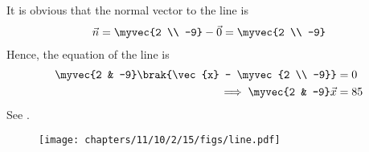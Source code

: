 It is obvious that the normal vector to the line is 
\begin{align}
\vec{n} =\myvec{2 \\ -9} -\vec{0} 
=\myvec{2 \\ -9}
\end{align}
Hence, the equation of the line is 
\begin{align}
	\myvec{2 & -9}\brak{\vec{x} - \myvec{2 \\ -9}}&= 0
	\\
	\implies 
	\myvec{2 & -9}\vec{x} &= 85
\end{align}
See 
		.
	\begin{figure}[H]
		\centering
 \texttt{[image: chapters/11/10/2/15/figs/line.pdf]}
		\caption{}
		\label{fig:11/10/2/15}
  	\end{figure}

